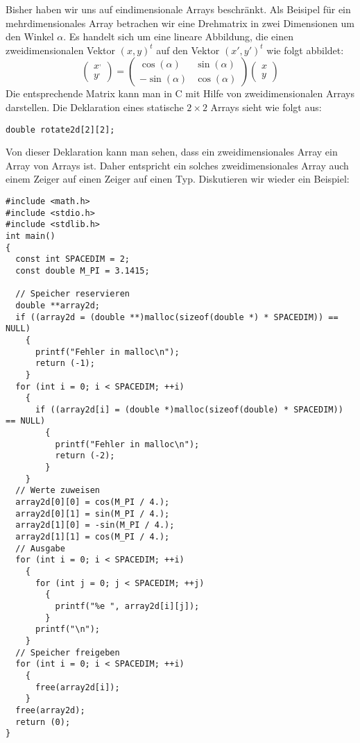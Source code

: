 Bisher haben wir uns auf eindimensionale Arrays beschränkt.
Als Beisipel für ein mehrdimensionales Array betrachen wir eine Drehmatrix in zwei Dimensionen um den Winkel $\alpha$. 
Es handelt sich um eine lineare Abbildung, die einen zweidimensionalen Vektor $(x,y)^t$ auf den Vektor $(x',y')^t$ wie folgt abbildet:
\begin{equation}
  \left(\begin{array}{c}x^{,}\\y^{,}\end{array}\right)=
  \left(\begin{array}{cc} \cos\left(\alpha\right) & \sin\left(\alpha\right) \\
    -\sin\left(\alpha\right) & \cos\left(\alpha\right) 
  \end{array}\right)
  \left(\begin{array}{c}x\\y\end{array}\right)
\end{equation}
Die entsprechende Matrix kann man in C mit Hilfe von zweidimensionalen Arrays darstellen.
Die Deklaration eines statische $2\times2$ Arrays sieht wie folgt aus:
\begin{lstlisting}
double rotate2d[2][2];
\end{lstlisting}
Von dieser Deklaration kann man sehen, dass ein zweidimensionales Array ein Array von Arrays ist.
Daher entspricht ein solches zweidimensionales Array auch einem Zeiger auf einen Zeiger auf einen Typ.
Diskutieren wir wieder ein Beispiel:
\begin{lstlisting}
#include <math.h>
#include <stdio.h>
#include <stdlib.h>
int main()
{
  const int SPACEDIM = 2;
  const double M_PI = 3.1415;

  // Speicher reservieren
  double **array2d;
  if ((array2d = (double **)malloc(sizeof(double *) * SPACEDIM)) == NULL)
    {
      printf("Fehler in malloc\n");
      return (-1);
    }
  for (int i = 0; i < SPACEDIM; ++i)
    {
      if ((array2d[i] = (double *)malloc(sizeof(double) * SPACEDIM)) == NULL)
        {
          printf("Fehler in malloc\n");
          return (-2);
        }
    }
  // Werte zuweisen
  array2d[0][0] = cos(M_PI / 4.);
  array2d[0][1] = sin(M_PI / 4.);
  array2d[1][0] = -sin(M_PI / 4.);
  array2d[1][1] = cos(M_PI / 4.);
  // Ausgabe
  for (int i = 0; i < SPACEDIM; ++i)
    {
      for (int j = 0; j < SPACEDIM; ++j)
        {
          printf("%e ", array2d[i][j]);
        }
      printf("\n");
    }
  // Speicher freigeben
  for (int i = 0; i < SPACEDIM; ++i)
    {
      free(array2d[i]);
    }
  free(array2d);
  return (0);
}
\end{lstlisting}
